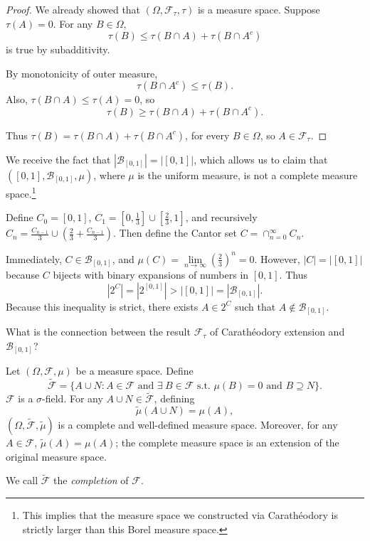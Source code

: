\begin{proof}
	We already showed that $(\Omega, \mathscr{F}_\tau, \tau)$ is a measure space. Suppose $\tau(A) = 0$. For any $B \in \Omega$, \[
		\tau(B) \le \tau(B \cap A) + \tau(B \cap A^{c})
	\] is true by subadditivity.

		By monotonicity of outer measure,
		\[
			\tau(B \cap A^{c}) \le \tau(B)
		.\]
		Also, $\tau(B \cap A) \le \tau(A) = 0$, so
		\[
			\tau(B) \ge \tau(B \cap A) + \tau(B \cap A^{c})
		.\] 

	Thus $\tau(B) = \tau(B \cap A) + \tau(B \cap A^{c})$, for every $B \in \Omega$, so $A \in \mathscr{F}_\tau$.
\end{proof}

We receive the fact that $\left| \mathscr{B}_{[0,1]} \right| = \left| [0,1] \right|$, which allows us to claim that $\left( [0,1], \mathscr{B}_{[0,1]}, \mu \right)$, where $\mu$ is the uniform measure, is not a complete measure space.\footnote{This implies that the measure space we constructed via Carath\'eodory is strictly larger than this Borel measure space.}

\begin{definition}
	Define $C_0 = [0,1]$, $C_1 = [0,\frac{1}{3}] \cup [\frac{2}{3},1]$, and recursively $C_n = \frac{C_{n-1}}{3} \cup \left( \frac{2}{3} + \frac{C_{n-1}}{3} \right)$. Then define the Cantor set $C = \cap_{n=0}^{\infty}C_n$. 
\end{definition}

Immediately, $C \in \mathscr{B}_{[0,1]}$, and $\mu(C) = \lim\limits_{n \to \infty} \left( \frac{2}{3} \right)^{n} = 0$. However, $\left| C \right| = \left| [0,1] \right|$ because $C$ bijects with binary expansions of numbers in $[0,1]$. Thus \[\left| 2^C \right| = \left| 2^{[0,1]} \right| > \left| [0,1] \right| = \left| \mathscr{B}_{[0,1]} \right|.\] Because this inequality is strict, there exists $A \in 2^C$ such that $A \not\in \mathscr{B}_{[0,1]}$.

What is the connection between the result $\mathscr{F}_\tau$ of Carath\'eodory extension and $\mathscr{B}_{[0,1]}$?

\begin{theorem}[Completion]
	Let $\left( \Omega, \mathscr{F},\mu \right)$ be a measure space. Define \[
		\tilde{\mathscr{F}} = \{A \cup N : A \in \mathscr{F} \text{ and } \exists\  B \in \mathscr{F} \text{ s.t. } \mu(B) = 0 \text{ and } B \supseteq N\}
	.\] 
	$\mathscr{F}$ is a $\sigma$-field. For any $A \cup N \in \tilde{\mathscr{F}}$, defining \[
		\tilde{\mu}(A \cup N ) = \mu(A)
	,\] $\left( \Omega, \tilde{\mathscr{F}}, \tilde{\mu} \right)$ is a complete and well-defined measure space. Moreover, for any $A \in \mathscr{F}$, $\tilde{\mu}(A) = \mu(A)$; the complete measure space is an extension of the original measure space.

	We call $\tilde{\mathscr{F}}$ the \emph{completion} of $\mathscr{F}$.
\end{theorem}

